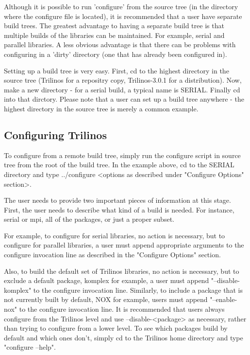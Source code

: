 \documentclass[12pt,relax]{SANDreport}
\begin{document}
Although it is possible to run 'configure' from the source tree (in 
the directory where the configure file is located), it is recommended that a 
user have separate build trees.  The greatest advantage to having a separate 
build tree is that multiple builds of the libraries can be maintained.  For 
example, serial and parallel libraries.  A less obvious advantage is that 
there can be problems with configuring in a 'dirty' directory (one that has 
already been configured in).

	Setting up a build tree is very easy.  First, cd to the highest 
directory in the source tree (Trilinos for a repositry copy, Trilinos-3.0.1 
for a distribution).  Now, make a new directory - for a serial build, a 
typical name is SERIAL.  Finally cd into that dirctory.  Please note that a 
user can set up a build tree anywhere - the highest directory in the source 
tree is merely a common example.

\subsection{Configuring Trilinos}

	To configure from a remote build tree, simply run the configure script 
in source tree from the root of the build tree.  In the example above, cd to 
the SERIAL directory and type ../configure <options as described under 
"Configure Options" section>.

	The user needs to provide two important pieces of information at this 
stage.  First, the user needs to describe what kind of a build is needed.  For 
instance, serial or mpi, all of the packages, or just a proper subset.  

	For example, to configure for serial libraries, no action is necessary,
but to configure for parallel libraries, a user must append appropriate 
arguments to the configure invocation line as described in the "Configure 
Options" section.

	Also, to build the default set of Trilinos libraries, no action is 
necessary, but to exclude a default package, komplex for example, a user must 
append "--disable-komplex" to the configure invocation  line.  Similarly, to 
include a package that is not currently built by default, NOX for example, 
users must append "--enable-nox" to the configure invocation line.  It is 
recommended that users always configure from the Trilinos level and use 
--disable-<package> as necessary, rather than trying to configure from a lower 
level.  To see which packages build by default and which ones don't, simply 
cd to the Trilinos home directory and type "configure --help".
\end{document}
